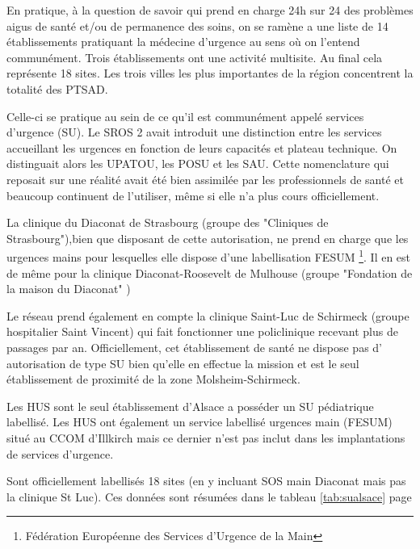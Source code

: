 \documentclass[12pt,english,french,twoside]{book}\usepackage[]{graphicx}\usepackage[]{color}
\begin{document}
En pratique, à la question de savoir qui prend en charge 24h sur 24 des problèmes aigus de santé et/ou de permanence des soins, on se ramène a une liste de 14 établissements pratiquant la médecine d'urgence au sens où on l'entend communément. Trois établissements ont une activité multisite. Au final cela représente 18 sites. Les trois villes les plus importantes de la région concentrent la totalité des PTSAD.

Celle-ci se pratique au sein de ce qu'il est communément appelé services d'urgence (SU). Le SROS 2 avait introduit une distinction entre les services accueillant les urgences en fonction de leurs capacités et plateau technique. On distinguait alors les UPATOU, les POSU et les SAU. Cette nomenclature qui reposait sur une réalité avait été bien assimilée par les professionnels de santé et beaucoup continuent de l'utiliser, même si elle n'a plus cours officiellement. 

La clinique du Diaconat de Strasbourg (groupe des "Cliniques de Strasbourg"),bien que disposant de cette autorisation, ne prend en charge que les urgences mains pour lesquelles elle dispose d'une labellisation FESUM \footnote{Fédération Européenne des Services d'Urgence de la Main}. Il en est de même pour la clinique Diaconat-Roosevelt de Mulhouse (groupe "Fondation de la maison du Diaconat" )

Le réseau prend également en compte la clinique Saint-Luc de Schirmeck (groupe hospitalier Saint Vincent) qui fait fonctionner une policlinique recevant plus de  passages par an. Officiellement, cet établissement de santé ne dispose pas d' autorisation de type SU bien qu'elle en effectue la mission et est le seul établissement de proximité de la zone Molsheim-Schirmeck.

Les HUS sont le seul établissement d'Alsace a posséder un SU pédiatrique labellisé. Les HUS ont également un service labellisé urgences main (FESUM) situé au CCOM d'Illkirch mais ce dernier n'est pas inclut dans les implantations de services d'urgence.

Sont officiellement labellisés 18 sites (en y incluant SOS main Diaconat mais pas la clinique St Luc). Ces données sont résumées dans le tableau \ref{tab:sualsace} page \pageref{tab:sualsace}
\end{document}

